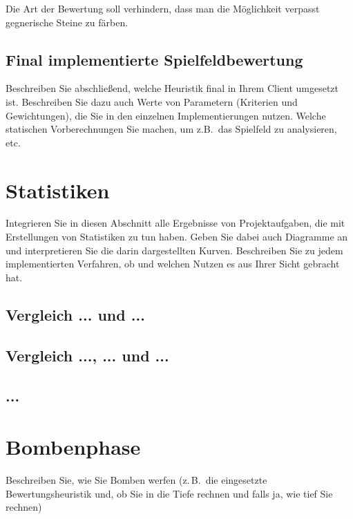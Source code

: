 \documentclass[12pt,a4paper,bibliography=totocnumbered,listof=totocnumbered]{scrartcl}
\begin{document}
Die Art der Bewertung soll verhindern, dass man die Möglichkeit verpasst gegnerische Steine zu färben.








\subsection{Final implementierte Spielfeldbewertung}
Beschreiben Sie abschließend, welche Heuristik final in Ihrem Client umgesetzt ist. Beschreiben Sie dazu auch Werte von Parametern (Kriterien und Gewichtungen), die Sie in den einzelnen Implementierungen nutzen. Welche statischen Vorberechnungen Sie machen, um z.B.\ das Spielfeld zu analysieren, etc.


\newpage
\section{Statistiken}
Integrieren Sie in diesen Abschnitt alle Ergebnisse von Projektaufgaben, die mit Erstellungen von Statistiken zu tun haben. Geben Sie dabei auch Diagramme an und interpretieren Sie die darin dargestellten Kurven. Beschreiben Sie zu jedem implementierten Verfahren, ob und welchen Nutzen es aus Ihrer Sicht gebracht hat.

\subsection{Vergleich ... und ...}

\subsection{Vergleich ..., ... und ...}

\subsection{...}


\newpage
\section{Bombenphase}
Beschreiben Sie, wie Sie Bomben werfen (z.\,B.\ die eingesetzte Bewertungsheuristik und, ob Sie in die Tiefe rechnen und falls ja, wie tief Sie rechnen)
\end{document}
